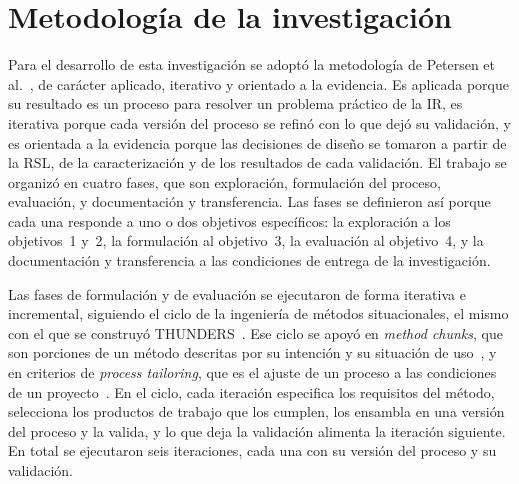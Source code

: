 \documentclass[12pt,letterpaper,oneside]{report}
\begin{document}
\section{Metodología de la investigación}
\label{sec:metodologia}
Para el desarrollo de esta investigación se adoptó la metodología de Petersen et
al.~\cite{petersen2008systematic}, de carácter aplicado, iterativo y
orientado a la evidencia. Es aplicada porque su resultado es un proceso para
resolver un problema práctico de la IR, es iterativa porque cada versión del
proceso se refinó con lo que dejó su validación, y es orientada a la evidencia
porque las decisiones de diseño se tomaron a partir de la RSL, de la
caracterización y de los resultados de cada validación. El trabajo se organizó
en cuatro fases, que son exploración, formulación del
proceso, evaluación, y documentación y transferencia. Las fases se definieron así
porque cada una responde a uno o dos objetivos específicos: la exploración a los
objetivos~1 y~2, la formulación al objetivo~3, la evaluación al objetivo~4, y la
documentación y transferencia a las condiciones de entrega de la investigación.

Las fases de formulación y de evaluación se ejecutaron de forma iterativa e
incremental, siguiendo el ciclo de la ingeniería de métodos situacionales, el
mismo con el que se construyó THUNDERS~\cite{agredo2022thesis,ralyte2001assembly}.
Ese ciclo se apoyó en \textit{method chunks}, que son porciones de un método
descritas por su intención y su situación de
uso~\cite{ralyte2001assembly,mirbel2006sme}, y en criterios de \textit{process
tailoring}, que es el ajuste de un proceso a las condiciones de un
proyecto~\cite{kalus2013tailoring}. En el ciclo, cada iteración especifica los
requisitos del método, selecciona los productos de trabajo que los cumplen, los ensambla
en una versión del proceso y la valida, y lo que deja la validación alimenta la
iteración siguiente. En total se ejecutaron seis iteraciones, cada una con su
versión del proceso y su validación.
\end{document}
